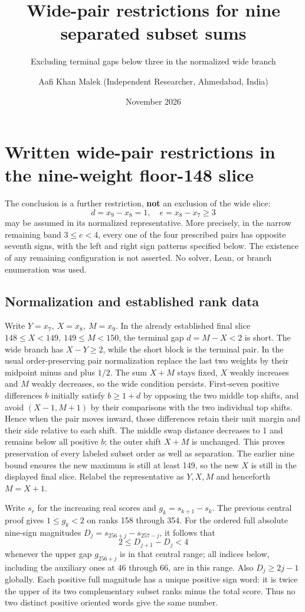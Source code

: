 \documentclass[
  11pt,
]{article}
\title{Wide-pair restrictions for nine separated subset sums}
\subtitle{Excluding terminal gaps below three in the normalized wide
branch}
\author{Aafi Khan Malek (Independent Researcher, Ahmedabad, India)}
\date{November 2026}
\begin{document}
\maketitle

\section{Written wide-pair restrictions in the nine-weight floor-148
slice}\label{written-wide-pair-restrictions-in-the-nine-weight-floor-148-slice}

The conclusion is a further restriction, \textbf{not} an exclusion of
the wide slice: \[
 \boxed{d=x_9-x_8=1,\quad e=x_8-x_7\ge3}
\] may be assumed in its normalized representative. More precisely, in
the narrow remaining band \(3\le e<4\), every one of the four prescribed
pairs has opposite seventh signs, with the left and right sign patterns
specified below. The existence of any remaining configuration is not
asserted. No solver, Lean, or branch enumeration was used.

\subsection{Normalization and established rank
data}\label{normalization-and-established-rank-data}

Write \(Y=x_7,\ X=x_8,\ M=x_9\). In the already established final slice
\(148\le X<149,\ 149\le M<150\), the terminal gap \(d=M-X<2\) is short.
The wide branch has \(X-Y\ge2\), while the short block is the terminal
pair. In the usual order-preserving pair normalization replace the last
two weights by their midpoint minus and plus \(1/2\). The sum \(X+M\)
stays fixed, \(X\) weakly increases and \(M\) weakly decreases, so the
wide condition persists. First-seven positive differences \(b\)
initially satisfy \(b\ge1+d\) by opposing the two middle top shifts, and
avoid \((X-1,M+1)\) by their comparisons with the two individual top
shifts. Hence when the pair moves inward, those differences retain their
unit margin and their side relative to each shift. The middle swap
distance decreases to 1 and remains below all positive \(b\); the outer
shift \(X+M\) is unchanged. This proves preservation of every labeled
subset order as well as separation. The earlier nine bound ensures the
new maximum is still at least 149, so the new \(X\) is still in the
displayed final slice. Relabel the representative as \(Y,X,M\) and
henceforth \(M=X+1\).

Write \(s_r\) for the increasing real scores and \(g_k=s_{k+1}-s_k\).
The previous central proof gives \(1\le g_k<2\) on ranks 158 through
354. For the ordered full absolute nine-sign magnitudes
\(D_j=s_{256+j}-s_{257-j}\), it follows that \[
 2\le D_{j+1}-D_j<4
\] whenever the upper gap \(g_{256+j}\) is in that central range; all
indices below, including the auxiliary ones at 46 through 66, are in
this range. Also \(D_j\ge2j-1\) globally. Each positive full magnitude
has a unique positive sign word: it is twice the upper of its two
complementary subset ranks minus the total score. Thus no two distinct
positive oriented words give the same number.
\end{document}
